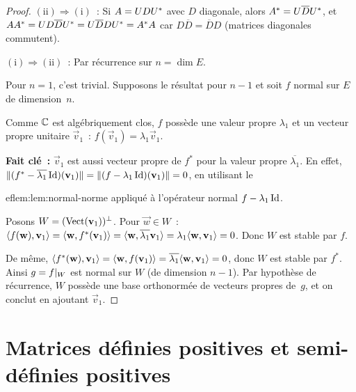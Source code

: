 \begin{proof}\leavevmode

  \noindent$(\mathrm{ii}) \Rightarrow (\mathrm{i})$~:
  Si $A = U D {U}^{*}$ avec $D$ diagonale, alors
  ${A}^{*} = U \overline{D} {U}^{*}$, et
  $A{A}^{*} = U D\overline{D} {U}^{*}
  = U \overline{D}D {U}^{*} = {A}^{*}A$ car $D\overline{D}
  = \overline{D}D$ (matrices diagonales commutent).

  \medskip
  \noindent$(\mathrm{i}) \Rightarrow (\mathrm{ii})$~:
  Par récurrence sur $n = \dim E$.

  Pour $n = 1$, c'est trivial. Supposons le résultat pour
  $n - 1$ et soit $f$ normal sur $E$ de dimension~$n$.

  Comme ${\mathbb{C}}$ est algébriquement clos, $f$ possède une valeur propre
  $\lambda_1$ et un vecteur propre unitaire $\vec{v}_1$~:
  $f(\vec{v}_1) = \lambda_1 \vec{v}_1$.

  \textbf{Fait clé~:} $\vec{v}_1$ est aussi vecteur propre de $f^*$
  pour la valeur propre $\overline{\lambda_1}$. En effet,
  $\lVert(f^* - \overline{\lambda_1}\operatorname{Id})(\mathbf{v}_1)\rVert
  = \lVert(f - \lambda_1\operatorname{Id})(\mathbf{v}_1)\rVert = 0$, en utilisant le
  
ef{lem:lem:normal-norme} appliqué à l'opérateur normal
  $f - \lambda_1 \operatorname{Id}$.

  Posons $W = (\operatorname{Vect}(\mathbf{v}_1))^\perp$. Pour $\vec{w} \in W$~:
  $\langle f(\mathbf{w}), \mathbf{v}_1\rangle
  = \langle\mathbf{w}, f^*(\mathbf{v}_1)\rangle
  = \langle\mathbf{w}, \overline{\lambda_1}\mathbf{v}_1\rangle
  = \lambda_1 \langle\mathbf{w}, \mathbf{v}_1\rangle = 0$.
  Donc $W$ est stable par $f$.

  De même, $\langle f^*(\mathbf{w}), \mathbf{v}_1\rangle
  = \langle\mathbf{w}, f(\mathbf{v}_1)\rangle
  = \overline{\lambda_1}\langle\mathbf{w}, \mathbf{v}_1\rangle = 0$,
  donc $W$ est stable par $f^*$. Ainsi $g = f{|_{W}}$ est normal
  sur $W$ (de dimension $n-1$). Par hypothèse de récurrence, $W$ possède
  une base orthonormée de vecteurs propres de~$g$, et on conclut en
  ajoutant $\vec{v}_1$.
\end{proof}

\section{Matrices définies positives et semi-définies positives}%
\label{sec:definie-positive}

